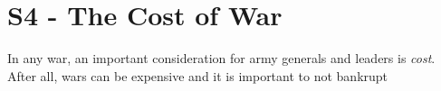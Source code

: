 \section*{S4 - The Cost of War}
In any war, an important consideration for army generals and leaders is \textit{cost}. After all, wars can be expensive and it is important to not bankrupt 